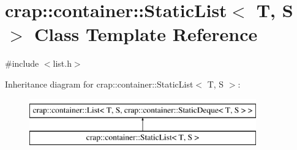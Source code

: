 \hypertarget{classcrap_1_1container_1_1_static_list}{\section{crap\-:\-:container\-:\-:Static\-List$<$ T, S $>$ Class Template Reference}
\label{classcrap_1_1container_1_1_static_list}
}


{\ttfamily \#include $<$list.\-h$>$}

Inheritance diagram for crap\-:\-:container\-:\-:Static\-List$<$ T, S $>$\-:\begin{figure}[H]
\begin{center}
\leavevmode
\includegraphics[height=2.000000cm]{classcrap_1_1container_1_1_static_list}
\end{center}
\end{figure}
